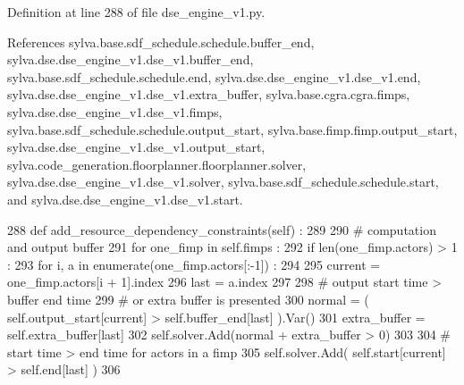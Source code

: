 Definition at line 288 of file dse\+\_\+engine\+\_\+v1.\+py.



References sylva.\+base.\+sdf\+\_\+schedule.\+schedule.\+buffer\+\_\+end, sylva.\+dse.\+dse\+\_\+engine\+\_\+v1.\+dse\+\_\+v1.\+buffer\+\_\+end, sylva.\+base.\+sdf\+\_\+schedule.\+schedule.\+end, sylva.\+dse.\+dse\+\_\+engine\+\_\+v1.\+dse\+\_\+v1.\+end, sylva.\+dse.\+dse\+\_\+engine\+\_\+v1.\+dse\+\_\+v1.\+extra\+\_\+buffer, sylva.\+base.\+cgra.\+cgra.\+fimps, sylva.\+dse.\+dse\+\_\+engine\+\_\+v1.\+dse\+\_\+v1.\+fimps, sylva.\+base.\+sdf\+\_\+schedule.\+schedule.\+output\+\_\+start, sylva.\+base.\+fimp.\+fimp.\+output\+\_\+start, sylva.\+dse.\+dse\+\_\+engine\+\_\+v1.\+dse\+\_\+v1.\+output\+\_\+start, sylva.\+code\+\_\+generation.\+floorplanner.\+floorplanner.\+solver, sylva.\+dse.\+dse\+\_\+engine\+\_\+v1.\+dse\+\_\+v1.\+solver, sylva.\+base.\+sdf\+\_\+schedule.\+schedule.\+start, and sylva.\+dse.\+dse\+\_\+engine\+\_\+v1.\+dse\+\_\+v1.\+start.


\begin{DoxyCode}
288   \textcolor{keyword}{def }add\_resource\_dependency\_constraints(self) :
289 
290     \textcolor{comment}{# computation and output buffer}
291     \textcolor{keywordflow}{for} one\_fimp \textcolor{keywordflow}{in} self.fimps :
292       \textcolor{keywordflow}{if} len(one\_fimp.actors) > 1 :
293         \textcolor{keywordflow}{for} i, a \textcolor{keywordflow}{in} enumerate(one\_fimp.actors[:-1]) :
294 
295           current = one\_fimp.actors[i + 1].index
296           last = a.index
297 
298           \textcolor{comment}{# output start time > buffer end time}
299           \textcolor{comment}{# or extra buffer is presented}
300           normal = ( self.output\_start[current] > self.buffer\_end[last] ).Var()
301           extra\_buffer = self.extra\_buffer[last]
302           self.solver.Add(normal + extra\_buffer > 0)
303 
304           \textcolor{comment}{# start time > end time for actors in a fimp}
305           self.solver.Add( self.start[current] > self.end[last] )
306 
\end{DoxyCode}
\mbox{\label{classsylva_1_1dse_1_1dse__engine__v1_1_1dse__v1_ae6821709a81198eb510ee236808dd1ba}} 
